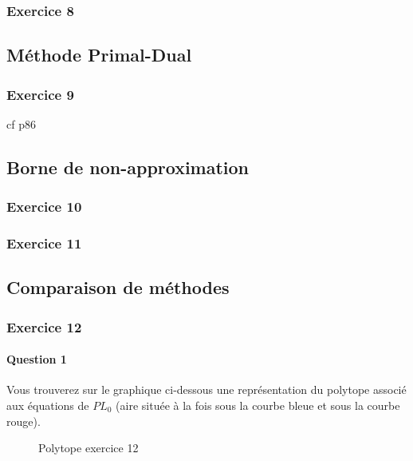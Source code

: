 \documentclass[a4paper, 12pt]{article}
\begin{document}
\subsubsection*{Exercice 8}

\subsection{Méthode Primal-Dual}

\subsubsection*{Exercice 9}

cf p86

\subsection{Borne de non-approximation}

\subsubsection*{Exercice 10}

\subsubsection*{Exercice 11}

\subsection{Comparaison de méthodes}

\subsubsection*{Exercice 12}

\paragraph{Question 1}

Vous trouverez sur le graphique ci-dessous une représentation du
polytope associé aux équations de $PL_0$ (aire située à la fois sous la courbe
bleue et sous la courbe rouge).

\begin{figure}[h!]
\centering
{}
\caption{Polytope exercice 12}
\end{figure}
\end{document}
